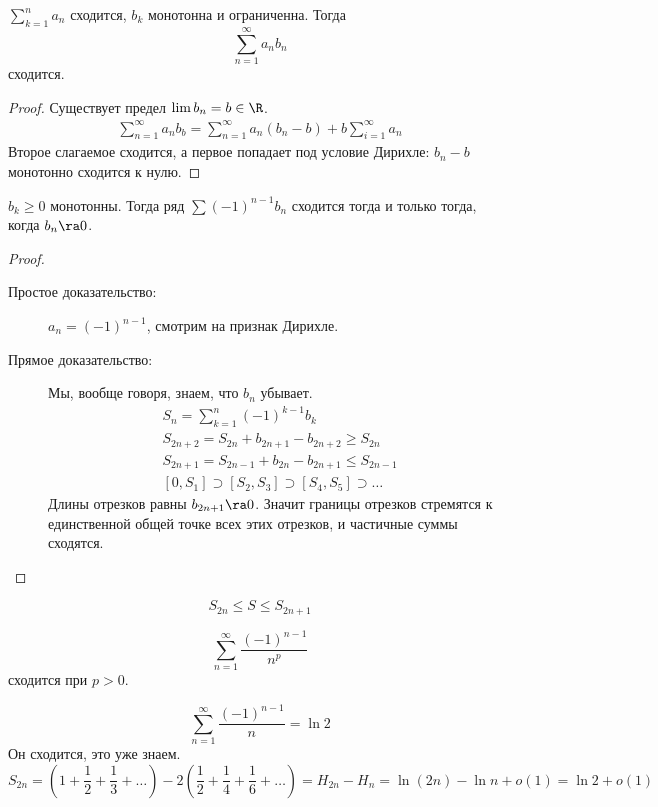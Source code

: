 \begin{theorem}
	$\sum_{k=1}^n a_n$ сходится, $b_k$ монотонна и ограниченна.
	Тогда
	\[ \sum_{n=1}^\infty a_n b_n \]
	сходится.
\end{theorem}

\begin{proof}
	Существует предел $\lim b_n = b \in \R$.
	\begin{gather*}
		\sum_{n=1}^\infty a_n b_b = \sum_{n=1}^\infty a_n (b_n - b) + b \sum_{i=1}^\infty a_n
	\end{gather*}
	Второе слагаемое сходится, а первое попадает под условие Дирихле: $b_n - b$ монотонно сходится к нулю.
\end{proof}

\begin{theorem}
	$b_k \ge 0$ монотонны.
	Тогда ряд $\sum (-1)^{n-1} b_n$ сходится тогда и только тогда, когда $b_n \ra 0$.
\end{theorem}
\begin{proof}
	\begin{description}
	\item[Простое доказательство:]
		$a_n = (-1)^{n-1}$, смотрим на признак Дирихле.

	\item[Прямое доказательство:]
		Мы, вообще говоря, знаем, что $b_n$ убывает.
		\begin{gather*}
			S_n = \sum_{k=1}^n (-1)^{k-1} b_k \\
			S_{2n+2} = S_{2n} + b_{2n+1} - b_{2n+2} \ge S_{2n} \\
			S_{2n+1} = S_{2n-1} + b_{2n} - b_{2n+1} \le S_{2n-1} \\
			[0, S_1] \supset [S_2, S_3] \supset [S_4, S_5] \supset \dots
		\end{gather*}
		Длины отрезков равны $b_{2n+1} \ra 0$.
		Значит границы отрезков стремятся к единственной общей точке всех этих отрезков, и частичные суммы сходятся.
	\end{description}
\end{proof}
\begin{Rem}
	\[ S_{2n} \le S \le S_{2n+1} \]
\end{Rem}

\begin{exmp}
	\[ \sum_{n=1}^\infty \frac{(-1)^{n-1}}{n^p} \]
	сходится при $p > 0$.
\end{exmp}

\begin{exmp}
	\[ \sum_{n=1}^\infty \frac{(-1)^{n-1}}n = \ln 2 \]
	Он сходится, это уже знаем.
	\[
		S_{2n}
		= \left(1 + \frac12 + \frac13 + \dots\right) - 2\left(\frac12 + \frac14 + \frac16 + \dots\right)
		= H_{2n} - H_n
		= \ln(2n) - \ln n + o(1)
		= \ln 2 + o(1)
	\]
\end{exmp}

